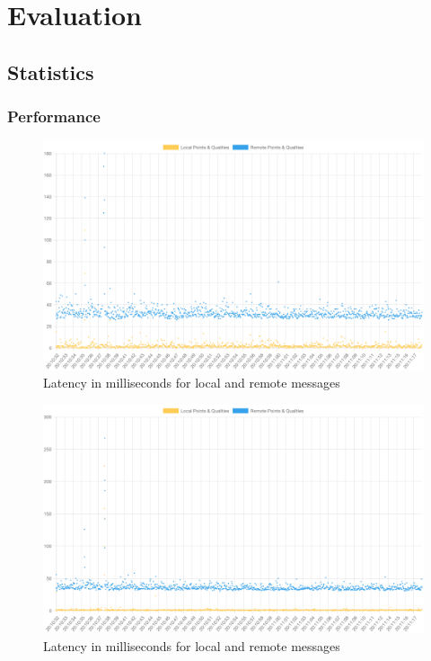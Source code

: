 \chapter{Evaluation}
\label{ch:evaluation}


\section{Statistics}
\label{sec:statistics}

\subsection{Performance}

\begin{figure}[h]
\centering
\includegraphics[scale=0.5]{04_Artefakte/01_Abbildungen/latency-65958016bcc0ee71c16f7fed}
\caption[Message latency on Computer A]{Latency in milliseconds for local and remote messages\protect}
\label{fig:latencyComputerA}
\end{figure}

\begin{figure}[h]
\centering
\includegraphics[scale=0.5]{04_Artefakte/01_Abbildungen/latency-65958034538b4baca4eb638a}
\caption[Message latency on Computer B]{Latency in milliseconds for local and remote messages\protect}
\label{fig:latencyComputerB}
\end{figure}

